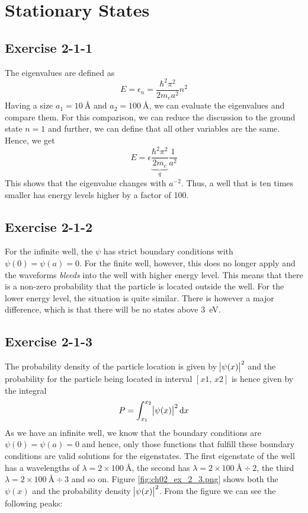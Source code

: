 \chapter{Stationary States}

\newpage
\section{Exercise 2-1-1}
The eigenvalues are defined as
\[
	E = \epsilon_n = \frac{\hbar^2 \pi^2}{2 m_e a^2} n^2
\]
Having a size $a_1 = \SI{10}{\angstrom}$ and $a_2 = \SI{100}{\angstrom}$,
we can evaluate the eigenvalues and compare them. For this comparison, we
can reduce the discussion to the ground state $n = 1$ and further, we can
define that all other variables are the same. Hence, we get
\[
	E = \epsilon \underbrace{\frac{\hbar^2 \pi^2}{2 m_e}}_{q} \frac{1}{a^2}
\]
This shows that the eigenvalue changes with $a^{-2}$. Thus, a well that is
ten times smaller has energy levels higher by a factor of 100.



\newpage
\section{Exercise 2-1-2}
For the infinite well, the $\psi$ has strict boundary conditions with
$\psi(0) = \psi(a) = 0$. For the finite well, however, this does no longer
apply and the waveforms \emph{bleeds} into the well with higher energy level.
This means that there is a non-zero probability that the particle is located
outside the well. For the lower energy level, the situation is quite similar.
There is however a major difference, which is that there will be no states
above \SI{3}{\eV}.

\newpage
\section{Exercise 2-1-3}
The probability density of the particle location is given by $\abs{\psi(x)}^2$
and the probability for the particle being located in interval $[x1, \,x2]$
is hence given by the integral
\[
	P = \int_{x_1}^{x_2} \abs{\psi(x)}^2 \dif x
\]
As we have an infinite well, we know that the boundary conditions are
$\psi(0)=\psi(a)=0$ and hence, only those functions that fulfill these boundary
conditions are valid solutions for the eigenstates. The first eigenstate of the
well has a wavelengths of $\lambda = 2 \times \SI{100}{\angstrom}$, the second
has $\lambda = 2 \times \SI{100}{\angstrom} \div 2$, the third
$\lambda = 2 \times \SI{100}{\angstrom} \div 3$ and so on. Figure
\ref{fig:ch02_ex_2_3.png} shows both the $\psi(x)$ and the probability
density $\abs{\psi(x)}^2$. From the figure we can see the following peaks:

